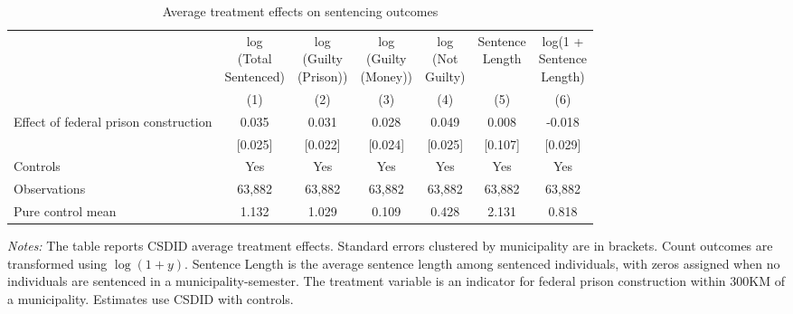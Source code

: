 \begin{table}[!htpb]\centering
\caption{Average treatment effects on sentencing outcomes}
\label{tab:att_sentencing}
\scriptsize
\begin{threeparttable}
\begin{tabular}{@{\extracolsep{0pt}}lcccccc}
\hline\hline
 & \shortstack{log\\(Total\\ Sentenced)} & \shortstack{log\\(Guilty\\ (Prison))} & \shortstack{log\\(Guilty\\ (Money))} & \shortstack{log\\(Not\\ Guilty)} & \shortstack{Sentence\\ Length} & \shortstack{log(1 +\\ Sentence\\ Length)} \\
 & (1) & (2) & (3) & (4) & (5) & (6) \\
\hline
Effect of federal prison construction & 0.035 & 0.031 & 0.028 & 0.049 & 0.008 & -0.018 \\
 & [0.025] & [0.022] & [0.024] & [0.025] & [0.107] & [0.029] \\
Controls & Yes & Yes & Yes & Yes & Yes & Yes \\
Observations & 63,882 & 63,882 & 63,882 & 63,882 & 63,882 & 63,882 \\
Pure control mean & 1.132 & 1.029 & 0.109 & 0.428 & 2.131 & 0.818 \\
\hline\hline
\end{tabular}
\begin{tablenotes}[flushleft]
\footnotesize \item \emph{Notes:} The table reports CSDID average treatment effects. Standard errors clustered by municipality are in brackets. Count outcomes are transformed using \(\log(1+y)\). Sentence Length is the average sentence length among sentenced individuals, with zeros assigned when no individuals are sentenced in a municipality-semester. The treatment variable is an indicator for federal prison construction within 300KM of a municipality. Estimates use CSDID with controls.
\end{tablenotes}
\end{threeparttable}
\end{table}
